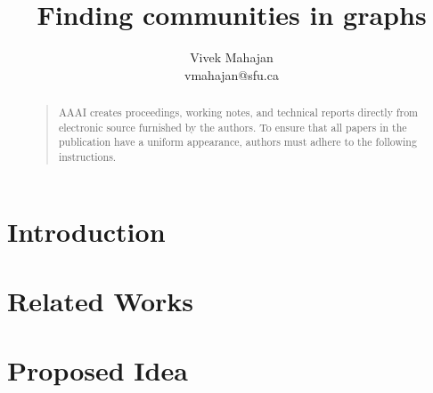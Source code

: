 \documentclass[letterpaper]{article}
\begin{document}
%
\title{Finding communities in graphs}
\author{Vivek Mahajan\\
vmahajan@sfu.ca\\
}
\maketitle
\begin{abstract}
\begin{quote}
AAAI creates proceedings, working notes, and technical reports directly from electronic source furnished by the authors. To ensure that all papers in the publication have a uniform appearance, authors must adhere to the following instructions. 
\end{quote}
\end{abstract}

\section{Introduction}

\section{Related Works}

\section{Proposed Idea}

\cite{test123}
 
\end{document}
